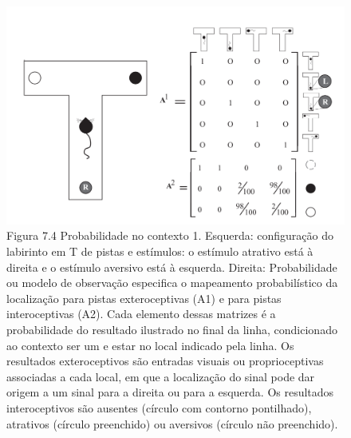 \documentclass[
  12pt,
]{book}
\begin{document}
\begin{figure}
\centering
\includegraphics{images/Figura_7_4.png}
\caption{Figura 7.4 Probabilidade no contexto 1. Esquerda: configuração do labirinto em T de pistas e estímulos: o estímulo atrativo está à direita e o estímulo aversivo está à esquerda. Direita: Probabilidade ou modelo de observação especifica o mapeamento probabilístico da localização para pistas exteroceptivas (A1) e para pistas interoceptivas (A2). Cada elemento dessas matrizes é a probabilidade do resultado ilustrado no final da linha, condicionado ao contexto ser um e estar no local indicado pela linha. Os resultados exteroceptivos são entradas visuais ou proprioceptivas associadas a cada local, em que a localização do sinal pode dar origem a um sinal para a direita ou para a esquerda. Os resultados interoceptivos são ausentes (círculo com contorno pontilhado), atrativos (círculo preenchido) ou aversivos (círculo não preenchido).}
\end{figure}
\end{document}
